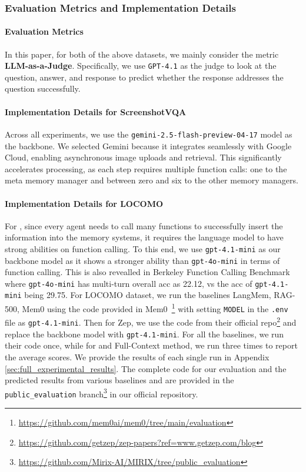 \subsubsection{Evaluation Metrics and Implementation Details}
\paragraph{Evaluation Metrics}
In this paper, for both of the above datasets, we mainly consider the metric \textbf{LLM-as-a-Judge}. Specifically, we use \texttt{GPT-4.1} as the judge to look at the question, answer, and response to predict whether the response addresses the question successfully. 

\paragraph{Implementation Details for ScreenshotVQA}
Across all experiments, we use the \texttt{gemini-2.5-flash-preview-04-17} model as the backbone. We selected Gemini because it integrates seamlessly with Google Cloud, enabling asynchronous image uploads and retrieval. This significantly accelerates processing, as each step requires multiple function calls: one to the meta memory manager and between zero and six to the other memory managers.

\paragraph{Implementation Details for LOCOMO} 
For \ours, since every agent needs to call many functions to successfully insert the information into the memory systems, it requires the language model to have strong abilities on function calling. To this end, we use \texttt{gpt-4.1-mini} as our backbone model as it shows a stronger ability than \texttt{gpt-4o-mini} in terms of function calling. This is also revealled in Berkeley Function Calling Benchmark~\citep{berkeley-function-calling-leaderboard} where \texttt{gpt-4o-mini} has multi-turn overall acc as 22.12, vs the acc of \texttt{gpt-4.1-mini} being 29.75. For LOCOMO dataset, we run the baselines LangMem, RAG-500, Mem0 using the code provided in Mem0~\footnote{\url{https://github.com/mem0ai/mem0/tree/main/evaluation}} with setting \texttt{MODEL} in the \texttt{.env} file as \texttt{gpt-4.1-mini}. Then for Zep, we use the code from their official repo\footnote{\url{https://github.com/getzep/zep-papers?ref=www.getzep.com/blog}} and replace the backbone model with \texttt{gpt-4.1-mini}. For all the baselines, we run their code once, while for \ours and Full-Context method, we run three times to report the average scores. We provide the results of each single run in Appendix \ref{sec:full_experimental_results}. 
The complete code for our evaluation and the predicted results from various baselines and \ours are provided in the \texttt{public\_evaluation} branch\footnote{\url{https://github.com/Mirix-AI/MIRIX/tree/public_evaluation}} in our official repository.







